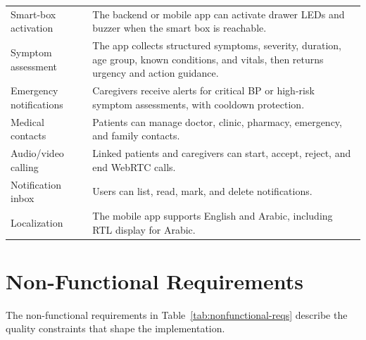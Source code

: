 \documentclass[12pt,a4paper]{report}
\begin{document}
\begin{longtable}{@{}>{\raggedright\arraybackslash}p{4.4cm}>{\raggedright\arraybackslash}p{10.0cm}@{}}
Smart-box activation & The backend or mobile app can activate drawer LEDs and buzzer when the smart box is reachable. \\
Symptom assessment & The app collects structured symptoms, severity, duration, age group, known conditions, and vitals, then returns urgency and action guidance. \\
Emergency notifications & Caregivers receive alerts for critical BP or high-risk symptom assessments, with cooldown protection. \\
Medical contacts & Patients can manage doctor, clinic, pharmacy, emergency, and family contacts. \\
Audio/video calling & Linked patients and caregivers can start, accept, reject, and end WebRTC calls. \\
Notification inbox & Users can list, read, mark, and delete notifications. \\
Localization & The mobile app supports English and Arabic, including RTL display for Arabic. \\
\end{longtable}
\endgroup

\clearpage
\section{Non-Functional Requirements}

The non-functional requirements in Table~\ref{tab:nonfunctional-reqs} describe
the quality constraints that shape the implementation.
\end{document}
